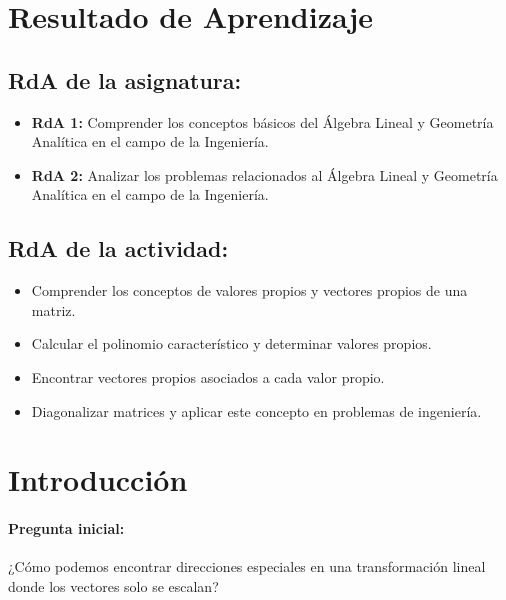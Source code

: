 \documentclass[a4,11pt]{aleph-notas}
\begin{document}
\encabezado

\section*{Resultado de Aprendizaje}  

\subsection*{RdA de la asignatura:}  
\begin{itemize}[leftmargin=*]  
    \item \textbf{RdA 1:} Comprender los conceptos básicos del Álgebra Lineal y Geometría Analítica en el campo de la Ingeniería.  
    \item \textbf{RdA 2:} Analizar los problemas relacionados al Álgebra Lineal y Geometría Analítica en el campo de la Ingeniería.  
\end{itemize}  

\subsection*{RdA de la actividad:}  
\begin{itemize}[leftmargin=*]  
    \item Comprender los conceptos de valores propios y vectores propios de una matriz.  
    \item Calcular el polinomio característico y determinar valores propios.  
    \item Encontrar vectores propios asociados a cada valor propio.  
    \item Diagonalizar matrices y aplicar este concepto en problemas de ingeniería.  
\end{itemize}  

\section*{Introducción}  

\paragraph{Pregunta inicial:}  
¿Cómo podemos encontrar direcciones especiales en una transformación lineal donde los vectores solo se escalan?
\end{document}
